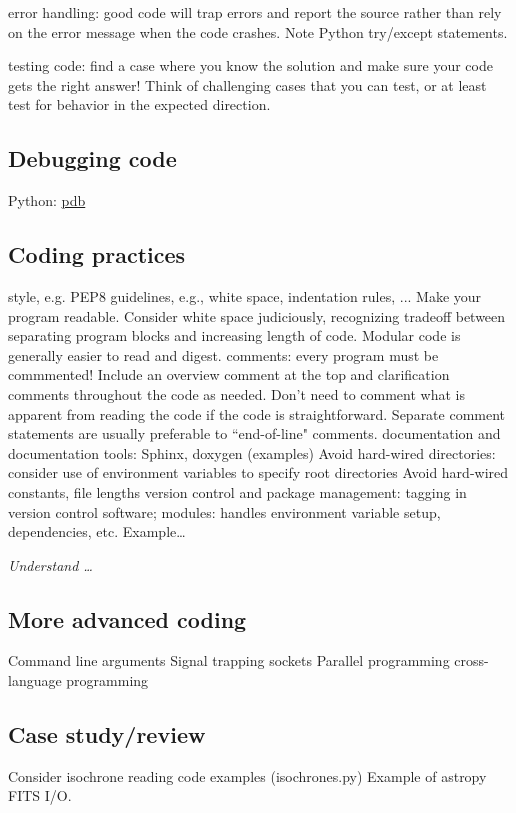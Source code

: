 \documentclass{article}
\newcommand{\test}[1]{%
    \begin{center}
        \colorbox{hl}{\parbox{0.9\textwidth}{\emph{#1}}}
    \end{center}}
\begin{document}
error handling: good code will trap errors and report the source
rather than rely on the error message when the code crashes. Note
Python try/except statements.

testing code: find a case where you know the solution and make sure
your code gets the right answer! Think of challenging cases that you
can test, or at least test for behavior in the expected direction.

\subsection{Debugging code}
Python: \href{https://docs.python.org/2/library/pdb.html}{pdb}

\subsection{Coding practices}
style, e.g. PEP8 guidelines, e.g., white space, indentation rules, ...
Make your program readable. Consider white space judiciously,
recognizing tradeoff between separating program blocks and increasing
length of code. Modular code is generally easier to read and digest.
comments: every program must be commmented! Include an overview
comment at the top and clarification comments throughout the code as
needed. Don't need to comment what is apparent from reading the code
if the code is straightforward. Separate comment statements are
usually preferable to ``end-of-line" comments.
documentation and documentation tools: Sphinx, doxygen (examples)
Avoid hard-wired directories: consider use of environment variables to
specify root directories
Avoid hard-wired constants, file lengths
version control and package management: tagging in version control
software; modules: handles environment variable setup, dependencies,
etc. Example\ldots

\test{Understand \ldots}

\subsection{More advanced coding}
Command line arguments
Signal trapping
sockets
Parallel programming
cross-language programming

\subsection{Case study/review}
Consider isochrone reading code examples (isochrones.py)
Example of astropy FITS I/O.
\end{document}
